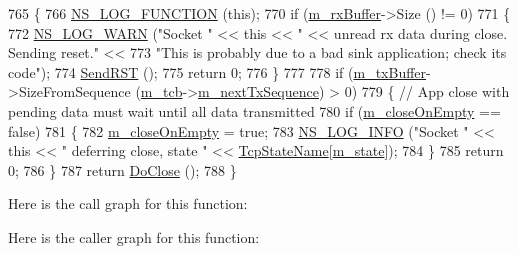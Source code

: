 \begin{DoxyCode}
765 \{
766   \hyperlink{log-macros-disabled_8h_a90b90d5bad1f39cb1b64923ea94c0761}{NS\_LOG\_FUNCTION} (\textcolor{keyword}{this});
770   \textcolor{keywordflow}{if} (\hyperlink{classns3_1_1TcpSocketBase_a0163894148e5a70e6bd89970a1483fae}{m\_rxBuffer}->Size () != 0)
771     \{
772       \hyperlink{group__logging_gade7208b4009cdf0e25783cd26766f559}{NS\_LOG\_WARN} (\textcolor{stringliteral}{"Socket "} << \textcolor{keyword}{this} << \textcolor{stringliteral}{" << unread rx data during close.  Sending reset."} <<
773                    \textcolor{stringliteral}{"This is probably due to a bad sink application; check its code"});
774       \hyperlink{classns3_1_1TcpSocketBase_a070b9ac86f372fe0b661050686bef68e}{SendRST} ();
775       \textcolor{keywordflow}{return} 0;
776     \}
777 
778   \textcolor{keywordflow}{if} (\hyperlink{classns3_1_1TcpSocketBase_a4a1b53982ffd851bd07ab8d5005c130e}{m\_txBuffer}->SizeFromSequence (\hyperlink{classns3_1_1TcpSocketBase_a26bbaf59001308dc43fb630d76f2e38b}{m\_tcb}->\hyperlink{classns3_1_1TcpSocketState_ad1f77b1cbdb9267a89ebb6f16ac76892}{m\_nextTxSequence}) > 0)
779     \{ \textcolor{comment}{// App close with pending data must wait until all data transmitted}
780       \textcolor{keywordflow}{if} (\hyperlink{classns3_1_1TcpSocketBase_a46c12a1d96840292ae2b55c3c2974214}{m\_closeOnEmpty} == \textcolor{keyword}{false})
781         \{
782           \hyperlink{classns3_1_1TcpSocketBase_a46c12a1d96840292ae2b55c3c2974214}{m\_closeOnEmpty} = \textcolor{keyword}{true};
783           \hyperlink{group__logging_gafbd73ee2cf9f26b319f49086d8e860fb}{NS\_LOG\_INFO} (\textcolor{stringliteral}{"Socket "} << \textcolor{keyword}{this} << \textcolor{stringliteral}{" deferring close, state "} << 
      \hyperlink{classns3_1_1TcpSocket_a1706f3309652d17f052b7d05816dd5ba}{TcpStateName}[\hyperlink{classns3_1_1TcpSocketBase_a5db6f29272f23546e23320c06a681f3e}{m\_state}]);
784         \}
785       \textcolor{keywordflow}{return} 0;
786     \}
787   \textcolor{keywordflow}{return} \hyperlink{classns3_1_1TcpSocketBase_adfc92c152f498c918cd73d4b31579472}{DoClose} ();
788 \}
\end{DoxyCode}


Here is the call graph for this function\+:




Here is the caller graph for this function\+:


